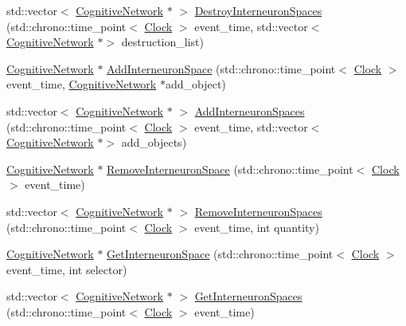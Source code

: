 \begin{DoxyCompactItemize}
\item 
std\+::vector$<$ \hyperlink{class_cognitive_network}{Cognitive\+Network} $\ast$ $>$ \hyperlink{class_cognitive_network_a718833496332e0471186c9a886005c4a}{Destroy\+Interneuron\+Spaces} (std\+::chrono\+::time\+\_\+point$<$ \hyperlink{universe_8h_a0ef8d951d1ca5ab3cfaf7ab4c7a6fd80}{Clock} $>$ event\+\_\+time, std\+::vector$<$ \hyperlink{class_cognitive_network}{Cognitive\+Network} $\ast$$>$ destruction\+\_\+list)
\item 
\hyperlink{class_cognitive_network}{Cognitive\+Network} $\ast$ \hyperlink{class_cognitive_network_ac6a7e01f097d0cb6434eb8fa7640c214}{Add\+Interneuron\+Space} (std\+::chrono\+::time\+\_\+point$<$ \hyperlink{universe_8h_a0ef8d951d1ca5ab3cfaf7ab4c7a6fd80}{Clock} $>$ event\+\_\+time, \hyperlink{class_cognitive_network}{Cognitive\+Network} $\ast$add\+\_\+object)
\item 
std\+::vector$<$ \hyperlink{class_cognitive_network}{Cognitive\+Network} $\ast$ $>$ \hyperlink{class_cognitive_network_aeafe16b9f44ae1316c072a85e726ee83}{Add\+Interneuron\+Spaces} (std\+::chrono\+::time\+\_\+point$<$ \hyperlink{universe_8h_a0ef8d951d1ca5ab3cfaf7ab4c7a6fd80}{Clock} $>$ event\+\_\+time, std\+::vector$<$ \hyperlink{class_cognitive_network}{Cognitive\+Network} $\ast$$>$ add\+\_\+objects)
\item 
\hyperlink{class_cognitive_network}{Cognitive\+Network} $\ast$ \hyperlink{class_cognitive_network_a04e38cea356f1c7ac31c4df5e19d759c}{Remove\+Interneuron\+Space} (std\+::chrono\+::time\+\_\+point$<$ \hyperlink{universe_8h_a0ef8d951d1ca5ab3cfaf7ab4c7a6fd80}{Clock} $>$ event\+\_\+time)
\item 
std\+::vector$<$ \hyperlink{class_cognitive_network}{Cognitive\+Network} $\ast$ $>$ \hyperlink{class_cognitive_network_a994c5f93447a82429809c89aa08d3dc1}{Remove\+Interneuron\+Spaces} (std\+::chrono\+::time\+\_\+point$<$ \hyperlink{universe_8h_a0ef8d951d1ca5ab3cfaf7ab4c7a6fd80}{Clock} $>$ event\+\_\+time, int quantity)
\item 
\hyperlink{class_cognitive_network}{Cognitive\+Network} $\ast$ \hyperlink{class_cognitive_network_a0119d61e86ea6b84ad7f69f88d59d008}{Get\+Interneuron\+Space} (std\+::chrono\+::time\+\_\+point$<$ \hyperlink{universe_8h_a0ef8d951d1ca5ab3cfaf7ab4c7a6fd80}{Clock} $>$ event\+\_\+time, int selector)
\item 
std\+::vector$<$ \hyperlink{class_cognitive_network}{Cognitive\+Network} $\ast$ $>$ \hyperlink{class_cognitive_network_a4daf966882d527b784bd359794ad39ca}{Get\+Interneuron\+Spaces} (std\+::chrono\+::time\+\_\+point$<$ \hyperlink{universe_8h_a0ef8d951d1ca5ab3cfaf7ab4c7a6fd80}{Clock} $>$ event\+\_\+time)

\end{DoxyCompactItemize}
